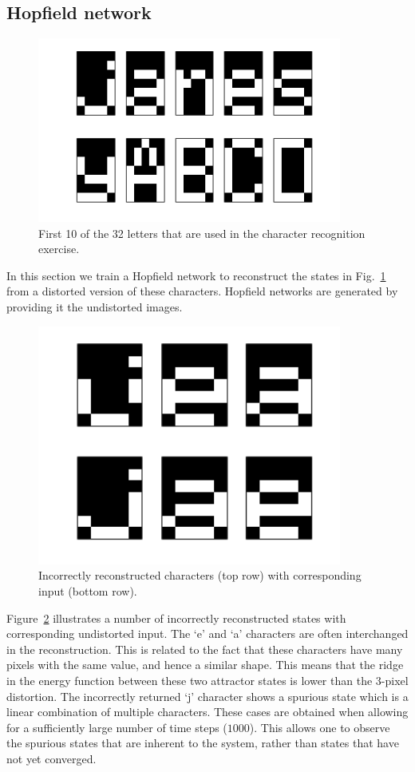 \documentclass[pdftex,12pt,a4paper]{article}
\begin{document}
\subsection{Hopfield network}
\begin{figure}[htb]
\centering
\includegraphics[width=10cm]{figs/letters.png}
\caption{First 10 of the 32 letters that are used in the character recognition exercise.\label{fig:letters}}
\end{figure}
In this section we train a Hopfield network to reconstruct the states in Fig.~\ref{fig:letters} from a distorted version of these characters. Hopfield networks are generated by providing it the undistorted images. 

\begin{figure}[htb]
\centering
\includegraphics[width=10cm]{figs/wrong_states.png}
\caption{Incorrectly reconstructed characters (top row) with corresponding input (bottom row).\label{fig:wrong_states}}
\end{figure}

Figure~\ref{fig:wrong_states} illustrates a number of incorrectly reconstructed states with corresponding undistorted input. The `e' and `a' characters are often interchanged in the reconstruction. This is related to the fact that these characters have many pixels with the same value, and hence a similar shape. This means that the ridge in the energy function between these two attractor states is lower than the 3-pixel distortion. 
The incorrectly returned `j' character shows a spurious state which is a linear combination of multiple characters.
These cases are obtained when allowing for a sufficiently large number of time steps ($1000$). This allows one to observe the spurious states that are inherent to the system, rather than states that have not yet converged.
\end{document}
